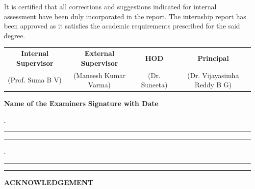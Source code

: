 \documentclass[12pt,a4paper]{report}
\begin{document}
\vspace{0.25cm}

\noindent
It is certified that all corrections and suggestions indicated for internal assessment have been duly incorporated in the report. The internship report has been approved as it satisfies the academic requirements prescribed for the said degree.

\vspace{1.2cm}

\begin{center}

\renewcommand{\arraystretch}{1.15}

\begin{tabular}{c c c c}

\textbf{Internal Supervisor} &
\textbf{External Supervisor} &
\textbf{HOD} &
\textbf{Principal}
\\[4pt]

(Prof. Suma B V) &
(Maneesh Kumar Varma) &
(Dr. Suneeta) &
(Dr. Vijayasimha Reddy B G)

\end{tabular}

\end{center}

\vspace{1cm}

\noindent
\textbf{Name of the Examiners}
\hfill
\textbf{Signature with Date}

\vspace{0.4cm}

.\hspace{0.2cm}\rule{5cm}{0.4pt}
\hfill
\rule{4cm}{0.4pt}

\vspace{0.4cm}

.\hspace{0.2cm}\rule{5cm}{0.4pt}
\hfill
\rule{4cm}{0.4pt}


\newpage
\setcounter{page}{2}  %
\begin{center}
{\LARGE \textbf{ACKNOWLEDGEMENT}\par}
\end{center}
\end{document}
